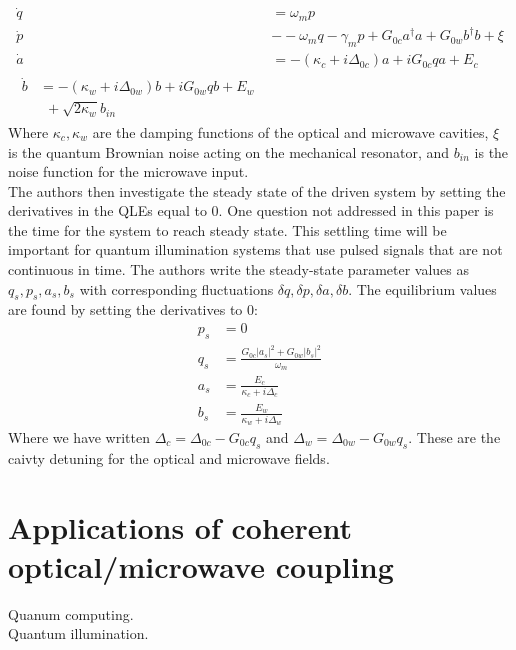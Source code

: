 \documentclass[a4paper,10pt,twocolumn]{article}
\numberwithin{equation}{section}
\begin{document}
\begin{align}
 \dot{q} &= \omega_mp\\
 \dot{p} &- -\omega_mq-\gamma_mp+G_{0c}a^\dagger a+G_{0w}b^\dagger b +\xi\\
 \dot{a} &= -(\kappa_c+i\Delta_{0c})a+iG_{0c}qa+E_c\\
 \begin{split}
 \dot{b} &= -(\kappa_w+i\Delta_{0w})b+iG_{0w}qb+E_w\\
         &\ \ +\sqrt{2\kappa_w}b_{in}
 \end{split}
\end{align}
Where $\kappa_c,\kappa_w$ are the damping functions of the optical and microwave cavities, $\xi$ is the quantum Brownian noise acting on the mechanical resonator,
and $b_{in}$ is the noise function for the microwave input.\\
The authors then investigate the steady state of the driven system by setting the derivatives in the QLEs equal to 0. 
One question not addressed in this paper is the time for the system to reach steady state. 
This settling time will be important for quantum illumination systems that use pulsed signals that are not continuous in time.
The authors  write the steady-state parameter values as $q_s,p_s,a_s, b_s$ with corresponding fluctuations $\delta q,\delta p,\delta a,\delta b$.
The equilibrium values are found by setting the derivatives to 0:
\begin{align}
 p_s &= 0\\
 q_s &= \frac{G_{0c}|a_s|^2+G_{0w}|b_s|^2}{\omega_m}\\
 a_s &= \frac{E_c}{\kappa_c+i\Delta_c}\\
 b_s &= \frac{E_w}{\kappa_w+i\Delta_w}
\end{align}
Where we have written $\Delta_c=\Delta_{0c}-G_{0c}q_s$ and $\Delta_w=\Delta_{0w}-G_{0w}q_s$. 
These are the caivty detuning for the optical and microwave fields. 

\section{Applications of coherent optical/microwave coupling}
Quanum computing.\\
Quantum illumination.
\end{document}
